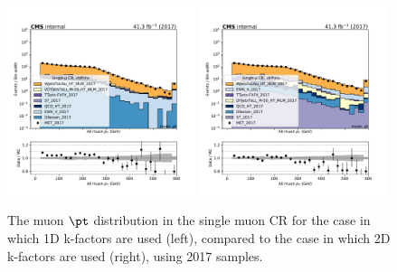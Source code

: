 \begin{figure}
    \begin{center}
        \includegraphics[width=0.49\textwidth]{fig/datamc_1dkfac/cr_1m_vbf/cr_1m_vbf_muon_pt_losf_2017.pdf}
        \includegraphics[width=0.49\textwidth]{fig/datamc/cr_1m_vbf/cr_1m_vbf_muon_pt_losf_2017.pdf} 
        \caption{The muon $\pt$ distribution in the single muon CR for the case in which 1D k-factors are used (left), 
        compared to the case in which 2D k-factors are used (right), using 2017 samples.}
        \label{fig:muon_pt_2017}
    \end{center}
\end{figure}

